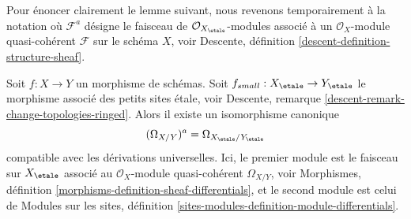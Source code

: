 \medskip\noindent
Pour énoncer clairement le lemme suivant, nous revenons temporairement à la notation
où $\mathcal{F}^a$ désigne le faisceau de $\mathcal{O}_{X_\etale}$-modules
associé à un $\mathcal{O}_X$-module quasi-cohérent $\mathcal{F}$
sur le schéma $X$, voir
Descente, définition \ref{descent-definition-structure-sheaf}.

\begin{lemma}
\label{lemma-match-modules-differentials}
Soit $f : X \to Y$ un morphisme de schémas. Soit
$f_{small} : X_\etale \to Y_\etale$ le morphisme associé
des petits sites \'etale, voir
Descente, remarque \ref{descent-remark-change-topologies-ringed}.
Alors il existe un isomorphisme canonique
$$
(\Omega_{X/Y})^a = \Omega_{X_\etale/Y_\etale}
$$
compatible avec les dérivations universelles. Ici, le premier module
est le faisceau sur $X_\etale$ associé
au $\mathcal{O}_X$-module quasi-cohérent $\Omega_{X/Y}$, voir
Morphismes, définition \ref{morphisms-definition-sheaf-differentials},
et le second module est celui de
Modules sur les sites,
définition \ref{sites-modules-definition-module-differentials}.
\end{lemma}

